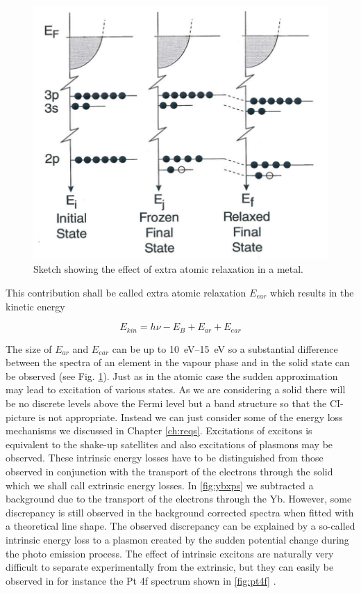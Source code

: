 \begin{figure}[h!]
	\begin{center}
	\includegraphics[scale=3]{figures/04_16.png}
	\caption{Sketch showing the effect of extra atomic relaxation in a metal.}
	\label{fig:atomicrelax}
	\end{center}
\end{figure}

This contribution shall be called extra atomic relaxation $E_{ear}$ which results in the kinetic energy

\begin{equation}
E_{kin}=h\nu-E_{B}+E_{ar} +E_{ear}
\end{equation}

The size of $E_{ar}$ and $E_{ear}$ can be up to \SIrange{10}{15}{\electronvolt} so a substantial difference between the spectra of an element in the vapour phase and in the solid state can be observed (see Fig. \ref{fig:atomicrelax}). Just as in the atomic case the sudden approximation may lead to excitation of various states. As we are considering a solid there will be no discrete levels above the Fermi level but a band structure so that the CI-picture is not appropriate. Instead we can just consider some of the energy loss mechanisms we discussed in Chapter \ref{ch:reqs}. Excitations of excitons is equivalent to the shake-up satellites and also excitations of plasmons may be observed. These intrinsic energy losses have to be distinguished from those observed in conjunction with the transport of the electrons through the solid which we shall call extrinsic energy losses. In \autoref{fig:ybxps} we subtracted a background due to the transport of the electrons through the Yb.  However, some discrepancy is still observed in the background corrected spectra when fitted  with a theoretical line shape. The observed discrepancy can be explained by a so-called intrinsic energy loss to a plasmon created by the sudden potential change during the photo emission process. The effect of intrinsic excitons are naturally very difficult to separate experimentally from the extrinsic, but they  can easily be observed in for instance the Pt 4f spectrum shown in \autoref{fig:pt4f} \cite{wertheim}.

